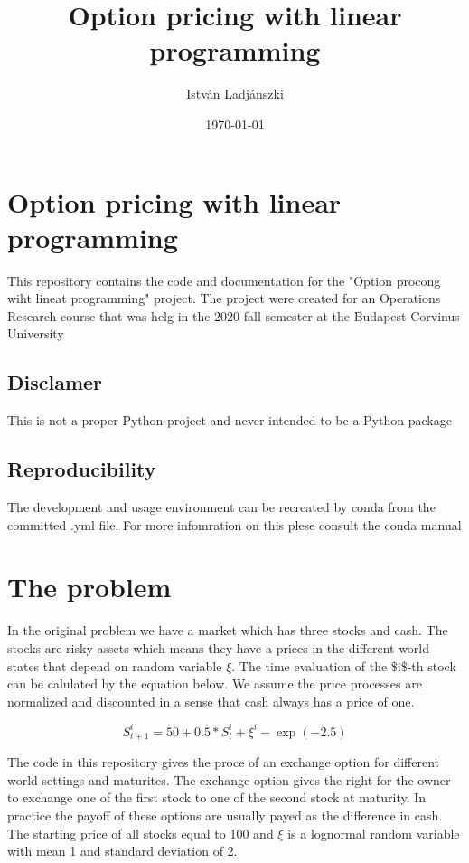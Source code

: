 \documentclass[11pt]{article}
\author{István Ladjánszki}
\date{\today}
\title{Option pricing with linear programming}
\begin{document}
\maketitle

\section{Option pricing with linear programming}
\label{sec:org10d96f3}
This repository contains the code and documentation for the "Option procong wiht lineat programming" project.
The project were created for an Operations Research course that was helg in the 2020 fall semester at the Budapest Corvinus University

\subsection{Disclamer}
\label{sec:orgbf78583}
This is not a proper Python project and never intended to be a Python package

\subsection{Reproducibility}
\label{sec:orgda5b5a6}
The development and usage environment can be recreated by conda from the committed .yml file. 
For more infomration on this plese consult the conda manual

\section{The problem}
\label{sec:org29f037f}
In the original problem we have a market which has three stocks and cash. The stocks are risky assets which means they have a prices in the different world states that depend on random variable \(\xi\). The time evaluation of the \$i\$-th stock can be calulated by the equation below. We assume the price processes are normalized and discounted in a sense that cash always has a price of one. 

\begin{equation}
S_{t+1}^i = 50 + 0.5 * S_{t}^i + \xi^i - \exp(-2.5)
\end{equation}

The code in this repository gives the proce of an exchange option for different world settings and maturites. The exchange option gives the right for the owner to exchange one of the first stock to one of the second stock at maturity. In practice the payoff of these options are usually payed as the difference in cash. The starting price of all stocks equal to 100 and \(\xi\) is a lognormal random variable with mean 1 and standard deviation of 2.
\end{document}
